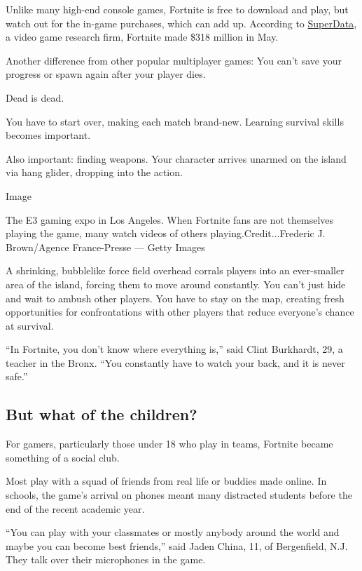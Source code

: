 Unlike many high-end console games, Fortnite is free to download and
play, but watch out for the in-game purchases, which can add up.
According to
\href{https://www.superdataresearch.com/us-digital-games-market/}{SuperData},
a video game research firm, Fortnite made \$318 million in May.

Another difference from other popular multiplayer games: You can't save
your progress or spawn again after your player dies.

Dead is dead.

You have to start over, making each match brand-new. Learning survival
skills becomes important.

Also important: finding weapons. Your character arrives unarmed on the
island via hang glider, dropping into the action.

Image

The E3 gaming expo in Los Angeles. When Fortnite fans are not themselves
playing the game, many watch videos of others playing.Credit...Frederic
J. Brown/Agence France-Presse --- Getty Images

A shrinking, bubblelike force field overhead corrals players into an
ever-smaller area of the island, forcing them to move around constantly.
You can't just hide and wait to ambush other players. You have to stay
on the map, creating fresh opportunities for confrontations with other
players that reduce everyone's chance at survival.

``In Fortnite, you don't know where everything is,'' said Clint
Burkhardt, 29, a teacher in the Bronx. ``You constantly have to watch
your back, and it is never safe.''

\hypertarget{but-what-of-the-children}{%
\subsection{But what of the children?}\label{but-what-of-the-children}}

For gamers, particularly those under 18 who play in teams, Fortnite
became something of a social club.

Most play with a squad of friends from real life or buddies made online.
In schools, the game's arrival on phones meant many distracted students
before the end of the recent academic year.

``You can play with your classmates or mostly anybody around the world
and maybe you can become best friends,'' said Jaden China, 11, of
Bergenfield, N.J. They talk over their microphones in the game.

